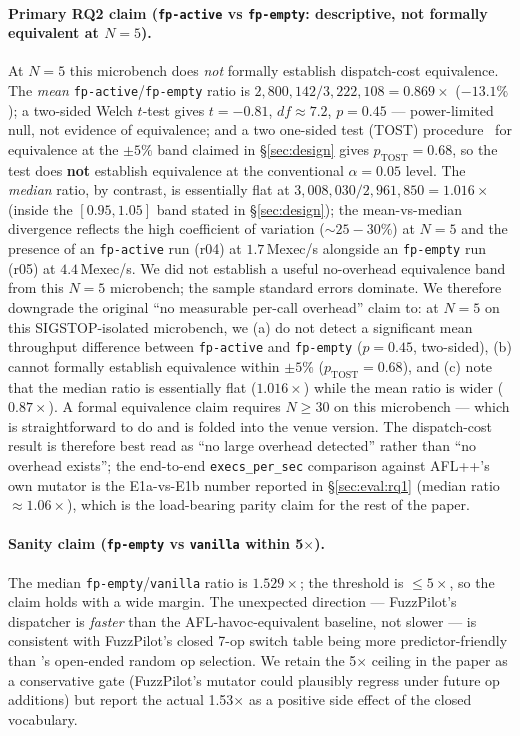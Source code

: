 \documentclass[11pt]{article}
\begin{document}
\paragraph{Primary RQ2 claim
  (\texttt{fp-active} vs \texttt{fp-empty}: descriptive, not
  formally equivalent at $N{=}5$).}
At $N{=}5$ this microbench does \emph{not} formally establish
dispatch-cost equivalence. The \emph{mean}
\texttt{fp-active}/\texttt{fp-empty} ratio is
$2{,}800{,}142 / 3{,}222{,}108 = 0.869\times$ ($-13.1\%$); a two-sided
Welch $t$-test gives $t{=}{-}0.81$, $df{\approx}7.2$, $p{=}0.45$ ---
power-limited null, not evidence of equivalence; and a two one-sided
test (TOST) procedure~\cite{schuirmann1987comparison} for equivalence
at the $\pm 5\%$ band claimed in \S\ref{sec:design} gives
$p_{\text{TOST}}{=}0.68$, so the test does \textbf{not} establish
equivalence at the conventional $\alpha{=}0.05$ level. The
\emph{median} ratio, by contrast, is essentially flat at
$3{,}008{,}030 / 2{,}961{,}850 = 1.016\times$ (inside the
$[0.95, 1.05]$ band stated in \S\ref{sec:design}); the
mean-vs-median divergence reflects the high coefficient of variation
($\sim 25{-}30\%$) at $N{=}5$ and the presence of an
\texttt{fp-active} run (r04) at $1.7\,$Mexec/s alongside an
\texttt{fp-empty} run (r05) at $4.4\,$Mexec/s. We did not establish a
useful no-overhead equivalence band from this $N{=}5$ microbench; the
sample standard errors dominate.
We therefore downgrade the original ``no measurable per-call
overhead'' claim to: at $N{=}5$ on this SIGSTOP-isolated
microbench, we (a) do not detect a significant mean throughput
difference between \texttt{fp-active} and \texttt{fp-empty}
($p{=}0.45$, two-sided), (b) cannot formally establish
equivalence within $\pm 5\%$ ($p_{\text{TOST}}{=}0.68$), and
(c) note that the median ratio is essentially flat
($1.016\times$) while the mean ratio is wider ($0.87\times$).
A formal equivalence claim requires $N{\geq}30$ on this
microbench --- which is straightforward to do and is folded into
the venue version. The dispatch-cost result is therefore best
read as ``no large overhead detected'' rather than ``no
overhead exists''; the end-to-end \texttt{execs\_per\_sec}
comparison against AFL++'s own mutator is the E1a-vs-E1b number
reported in \S\ref{sec:eval:rq1} (median ratio
$\approx 1.06\times$), which is the load-bearing parity claim
for the rest of the paper.

\paragraph{Sanity claim
  (\texttt{fp-empty} vs \texttt{vanilla} within 5$\times$).}
The median \texttt{fp-empty}/\texttt{vanilla} ratio is $1.529\times$;
the threshold is $\leq 5\times$, so the claim holds with a wide
margin. The unexpected direction --- FuzzPilot's dispatcher is
\emph{faster} than the AFL-havoc-equivalent baseline, not slower ---
is consistent with FuzzPilot's closed 7-op switch table being more
predictor-friendly than 's open-ended
random op selection. We retain the 5$\times$ ceiling in the paper as
a conservative gate (FuzzPilot's mutator could plausibly regress under
future op additions) but report the actual 1.53$\times$ as a positive
side effect of the closed vocabulary.
\end{document}
